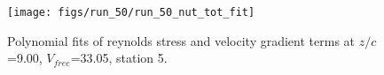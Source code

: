 \begin{figure}[H]
\centering
\texttt{[image: figs/run\_50/run\_50\_nut\_tot\_fit]}
\caption{Polynomial fits of reynolds stress and velocity gradient terms at $z/c$=9.00, $V_{free}$=33.05, station 5.}
\label{fig:run_50_nut_tot_fit}
\end{figure}


